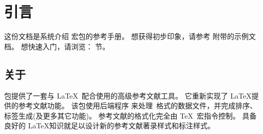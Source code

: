 

\section{引言}
\label{int}


这份文档是系统介绍 \biblatex 宏包的参考手册。
想获得初步印象，请参考 \biblatex 附带的示例文档。
想快速入门，请浏览： 节。


\subsection{关于 \biblatex}
\label{int:abt}


\biblatex 包提供了一套与 \LaTeX\ 配合使用的高级参考文献工具。
它重新实现了 \LaTeX 提供的参考文献功能。
该包使用后端程序 \biber 来处理\BibTeX\ 格式的数据文件，并完成排序、标签生成(及更多其它功能)。
参考文献的格式化完全由 \TeX\ 宏指令控制。
具备良好的 \LaTeX 知识就足以设计新的参考文献著录样式和标注样式。

